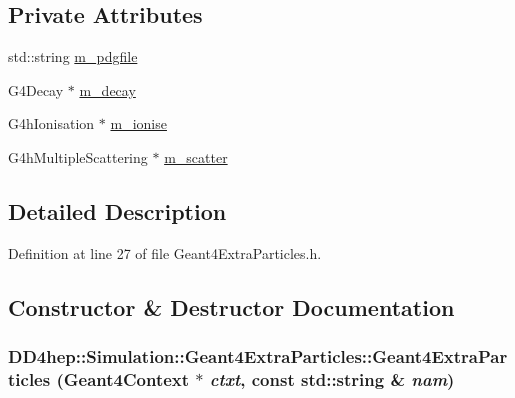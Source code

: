 \subsection*{Private Attributes}
\begin{DoxyCompactItemize}
\item 
std::string \hyperlink{class_d_d4hep_1_1_simulation_1_1_geant4_extra_particles_ac50ed0b5305835df3be2537c93483d6b}{m\_\-pdgfile}
\item 
G4Decay $\ast$ \hyperlink{class_d_d4hep_1_1_simulation_1_1_geant4_extra_particles_a83b8c92a3c21c6068ddfe5f93ac650df}{m\_\-decay}
\item 
G4hIonisation $\ast$ \hyperlink{class_d_d4hep_1_1_simulation_1_1_geant4_extra_particles_a3a1a935a2a36d8e61af6c632fa7b847b}{m\_\-ionise}
\item 
G4hMultipleScattering $\ast$ \hyperlink{class_d_d4hep_1_1_simulation_1_1_geant4_extra_particles_ac682ea9380ab2726b966bd9829b279c4}{m\_\-scatter}
\end{DoxyCompactItemize}


\subsection{Detailed Description}


Definition at line 27 of file Geant4ExtraParticles.h.

\subsection{Constructor \& Destructor Documentation}
\hypertarget{class_d_d4hep_1_1_simulation_1_1_geant4_extra_particles_a6010ec49bacd3f02f24ee026fe0aac3f}{
\subsubsection[{Geant4ExtraParticles}]{\setlength{\rightskip}{0pt plus 5cm}DD4hep::Simulation::Geant4ExtraParticles::Geant4ExtraParticles ({\bf Geant4Context} $\ast$ {\em ctxt}, \/  const std::string \& {\em nam})}}
\label{class_d_d4hep_1_1_simulation_1_1_geant4_extra_particles_a6010ec49bacd3f02f24ee026fe0aac3f}


